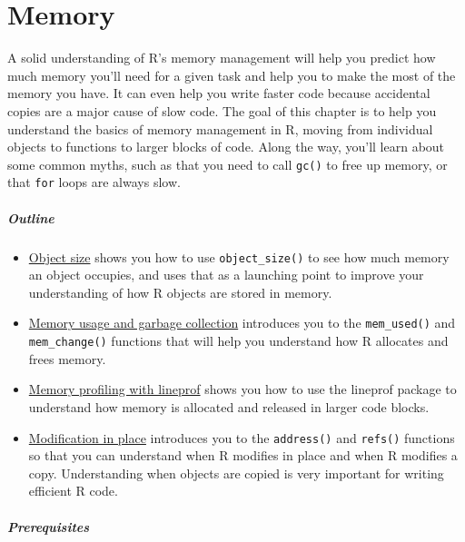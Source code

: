 \hypertarget{memory}{%
\chapter{Memory}\label{memory}}

A solid understanding of R's memory management will help you predict how
much memory you'll need for a given task and help you to make the most
of the memory you have. It can even help you write faster code because
accidental copies are a major cause of slow code. The goal of this
chapter is to help you understand the basics of memory management in R,
moving from individual objects to functions to larger blocks of code.
Along the way, you'll learn about some common myths, such as that you
need to call \texttt{gc()} to free up memory, or that \texttt{for} loops
are always slow. 

\hypertarget{outline}{%
\paragraph{Outline}\label{outline}}

\begin{itemize}
\item
  \protect\hyperlink{object-size}{Object size} shows you how to use
  \texttt{object\_size()} to see how much memory an object occupies, and
  uses that as a launching point to improve your understanding of how R
  objects are stored in memory.
\item
  \protect\hyperlink{gc}{Memory usage and garbage collection} introduces
  you to the \texttt{mem\_used()} and \texttt{mem\_change()} functions
  that will help you understand how R allocates and frees memory.
\item
  \protect\hyperlink{memory-profiling}{Memory profiling with lineprof}
  shows you how to use the lineprof package to understand how memory is
  allocated and released in larger code blocks.
\item
  \protect\hyperlink{modification}{Modification in place} introduces you
  to the \texttt{address()} and \texttt{refs()} functions so that you
  can understand when R modifies in place and when R modifies a copy.
  Understanding when objects are copied is very important for writing
  efficient R code.
\end{itemize}

\hypertarget{prerequisites}{%
\paragraph{Prerequisites}\label{prerequisites}}


